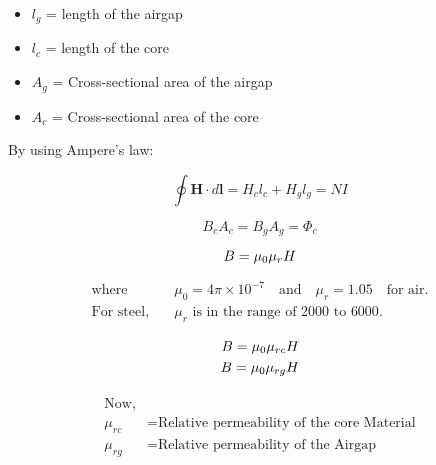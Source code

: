 \documentclass{article}
\begin{document}
\huge
\begin{itemize}
    \item \( l_g \) = length of the airgap
    \item \( l_c \) = length of the core
    \item \( A_g \) = Cross-sectional area of the airgap
    \item \( A_c \) = Cross-sectional area of the core
\end{itemize}

By using Ampere's law:

\begin{equation}
    \oint \mathbf{H} \cdot d\mathbf{l} = H_c l_c + H_g l_g = NI \tag{1}
\end{equation}





\begin{equation}
    B_c A_c = B_g A_g = \Phi_c \tag{2}
\end{equation}

\vspace{0.5cm} %
\begin{equation*}
   \Huge  {B} = \mu_0 \mu_r {H}
\end{equation*}

\begin{align*}
\text{where} \quad & \mu_0 = 4 \pi \times 10^{-7} \quad \text{and} \quad \mu_r = 1.05 \quad \text{for air}. \\
\text{For steel,} \quad & \mu_r \text{ is in the range of } 2000 \text{ to } 6000.
\end{align*}

\vspace{0.5cm} %
\begin{equation*}
\begin{split}
   \Huge  {B} = \mu_0 \mu_{rc} {H}\\
  \Huge  {B} = \mu_0 \mu_{rg} {H}
\end{split}
\end{equation*}




\begin{equation*}
\begin{split}
\begin{aligned}
\text{Now,} \\
\mu_{rc} &= \text{Relative permeability of the core Material}\\
\mu_{rg} &= \text{Relative permeability of the Airgap}
\end{aligned}
\end{split}
\end{equation*}
\end{document}

